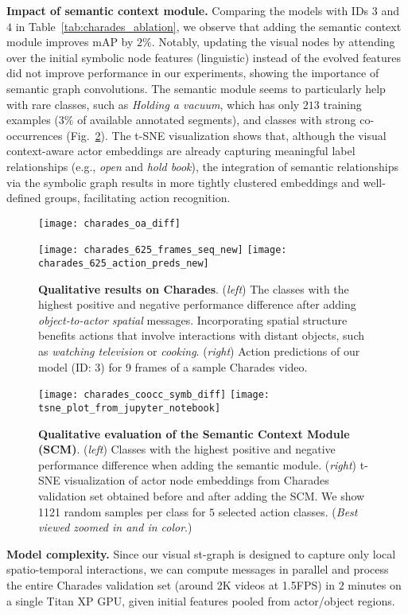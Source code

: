 \documentclass[runningheads]{llncs}
\begin{document}
\textbf{Impact of semantic context module.} Comparing the models with IDs $3$ and $4$ in Table~\ref{tab:charades_ablation}, we observe that adding the semantic context module improves mAP by $2\%$. Notably, updating the visual nodes by attending over the initial symbolic node features (linguistic) instead of the evolved features did not improve performance in our experiments, showing the importance of semantic graph convolutions. The semantic module seems to particularly help with rare classes, such as \emph{Holding a vacuum}, which has only $213$ training examples ($3\%$ of available annotated segments), and classes with strong co-occurrences (Fig.~\ref{fig:tsne}). The t-SNE visualization shows that, although the visual context-aware actor embeddings are already capturing
meaningful label relationships (e.g., \emph{open} and \emph{hold book}), the integration of semantic relationships via the symbolic graph results in more tightly clustered embeddings and well-defined groups, facilitating action recognition.
\begin{figure}[ht]
\begin{minipage}{0.45\textwidth}
   \centering\texttt{[image: charades\_oa\_diff]}
\end{minipage}
\begin{minipage}{0.45\textwidth}
\centering\texttt{[image: charades\_625\_frames\_seq\_new]}
\centering\texttt{[image: charades\_625\_action\_preds\_new]}
\end{minipage}
   \caption{\textbf{Qualitative results on Charades}. (\emph{left}) The classes with the highest positive and negative performance difference after adding \emph{object-to-actor spatial} messages. Incorporating spatial structure benefits actions that involve interactions with distant objects, such as \emph{watching television} or \emph{cooking}. (\emph{right}) Action predictions of our model (ID: 3) for 9 frames of a sample Charades video.
}
\label{fig:charades_diff_per_class}
\end{figure}
\begin{figure}[ht]
\centering\texttt{[image: charades\_coocc\_symb\_diff]}
\centering\texttt{[image: tsne\_plot\_from\_jupyter\_notebook]}
 \caption{\textbf{Qualitative evaluation of the Semantic Context Module (SCM)}. (\emph{left}) Classes with the highest positive and negative performance difference when adding the semantic module. (\emph{right}) t-SNE visualization of actor node embeddings from Charades validation set obtained before and after adding the SCM. We show 1121 random samples per class for $5$ selected action classes. (\emph{Best viewed zoomed in and in color}.)}
\label{fig:tsne}
\end{figure}
\textbf{Model complexity.} Since our visual st-graph is designed to capture only local spatio-temporal interactions, we can compute messages in parallel and process the entire Charades validation set (around 2K videos at 1.5FPS) in
$2$ minutes on a single Titan XP GPU, given initial features pooled from actor/object regions. 
\end{document}
